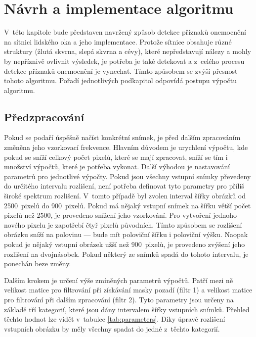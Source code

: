 \chapter{Návrh a implementace algoritmu}
\label{ch:navrh}
V~této kapitole bude představen navržený způsob detekce příznaků onemocnění na sítnici lidského oka a jeho implementace. Protože sítnice obsahuje různé struktury (žlutá skvrna, slepá skvrna a cévy), které nepředstavují nálezy a mohly by nepříznivě ovlivnit výsledek, je potřeba je také detekovat a z~celého procesu detekce příznaků onemocnění je vynechat. Tímto způsobem se zvýší přesnost tohoto algoritmu. Pořadí jednotlivých podkapitol odpovídá postupu výpočtu algoritmu.

\section{Předzpracování}
Pokud se podaří úspěšně načíst konkrétní snímek, je před dalším zpracováním změněna jeho vzorkovací frekvence. Hlavním důvodem je urychlení výpočtu, kde pokud se sníží celkový počet pixelů, které se mají zpracovat, sníží se tím i množství výpočtů, které je potřeba vykonat. Další výhodou je nastavování parametrů pro jednotlivé výpočty. Pokud jsou všechny vstupní snímky převedeny do určitého intervalu rozlišení, není potřeba definovat tyto parametry pro příliš široké spektrum rozlišení. V~tomto případě byl zvolen interval šířky obrázků od 2500~pixelů do 900~pixelů. Pokud má nějaký vstupní snímek na šířku větší počet pixelů než 2500, je provedeno snížení jeho vzorkování. Pro vytvoření jednoho nového pixelu je zapotřebí čtyř pixelů původních. Tímto způsobem se rozlišení obrázku sníží na polovinu --- bude mít poloviční šířku i poloviční výšku. Naopak pokud je nějaký vstupní obrázek užší než 900~pixelů, je provedeno zvýšení jeho rozlišení na dvojnásobek. Pokud některý ze snímků spadá do tohoto intervalu, je ponechán beze změny.

Dalším krokem je určení výše zmíněných parametrů výpočtů. Patří mezi ně velikost matice pro filtrování při získávání masky pozadí (filtr 1) a velikost matice pro filtrování při dalším zpracování (filtr 2). Tyto parametry jsou určeny na základě tří kategorií, které jsou dány intervalem šířky vstupních snímků. Přehled těchto hodnot lze vidět v~tabulce \ref{tab:parameters}. Díky úpravě rozlišení vstupních obrázku by měly všechny spadat do jedné z~těchto kategorií.

